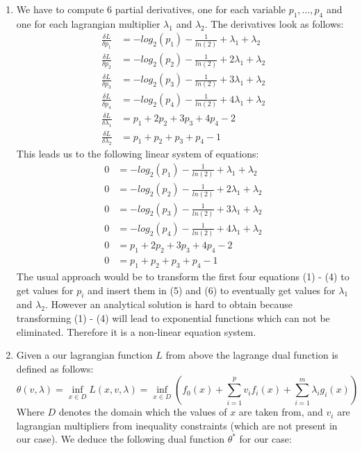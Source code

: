 \documentclass[accentcolor=tud9c]{tudexercise}
\begin{document}
\begin{enumerate}
	\item %
	We have to compute 6 partial derivatives, one for each variable $p_1,...,p_4$ and one for each lagrangian multiplier $\lambda_1$ and $\lambda_2$. The derivatives look as follows:
	\begin{align*}
	\frac{\delta L}{\delta p_1} &= -log_2(p_1) - \frac{1}{ln(2)} + \lambda_1 + \lambda_2 \\
	\frac{\delta L}{\delta p_2} &= -log_2(p_2) - \frac{1}{ln(2)} + 2\lambda_1 + \lambda_2 \\
	\frac{\delta L}{\delta p_3} &= -log_2(p_3) - \frac{1}{ln(2)} + 3\lambda_1 + \lambda_2 \\
	\frac{\delta L}{\delta p_4} &= -log_2(p_4) - \frac{1}{ln(2)} + 4\lambda_1 + \lambda_2 \\
	\frac{\delta L}{\delta \lambda_1} &= p_1 + 2p_2 + 3p_3 + 4p_4 - 2 \\
	\frac{\delta L}{\delta \lambda_2} &= p_1 + p_2 + p_3 + p_4 - 1
	\end{align*}
	This leads us to the following linear system of equations:
	\begin{align}
	0 &= -log_2(p_1) - \frac{1}{ln(2)} + \lambda_1 + \lambda_2 \\
	0 &= -log_2(p_2) - \frac{1}{ln(2)} + 2\lambda_1 + \lambda_2 \\
	0 &= -log_2(p_3) - \frac{1}{ln(2)} + 3\lambda_1 + \lambda_2 \\
	0 &= -log_2(p_4) - \frac{1}{ln(2)} + 4\lambda_1 + \lambda_2 \\
	0 &= p_1 + 2p_2 + 3p_3 + 4p_4 - 2 \\
	0 &= p_1 + p_2 + p_3 + p_4 - 1
	\end{align}
	The usual approach would be to transform the first four equations (1) - (4) to get values for $p_i$ and insert them in (5) and (6) to eventually get values for $\lambda_1$ and $\lambda_2$. However an analytical solution is hard to obtain because transforming (1) - (4) will lead to exponential functions which can not be eliminated. Therefore it is a non-linear equation system.
	\item %
	Given a our lagrangian function $L$ from above the lagrange dual function is defined as follows:
	\[
		\theta (v, \lambda) = \inf_{x\in D} L(x, v, \lambda) = \inf_{x\in D}\left( f_0(x) + \sum_{i=1}^{p}v_if_i(x) + \sum_{i=1}^{m}\lambda_i g_i(x)\right)
	\]
	Where $D$ denotes the domain which the values of $x$ are taken from, and $v_i$ are lagrangian multipliers from inequality constraints (which are not present in our case). We deduce the following dual function $\theta^{*}$ for our case:

\end{enumerate}
\end{document}

